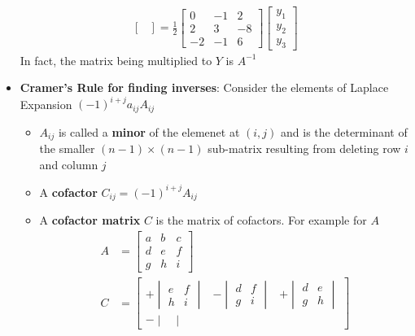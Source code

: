 \begin{itemize}
\begin{align*}
\begin{bmatrix}
      \end{bmatrix}
      = \frac{1}{2} \begin{bmatrix}
        0 & -1 & 2\\
        2 & 3 & -8\\
        -2 & -1 & 6
      \end{bmatrix} \begin{bmatrix}
        y_1\\ y_2\\ y_3
      \end{bmatrix}
    \end{align*}
    In fact, the matrix being multiplied to $Y$ is $A^{-1}$
  \item \textbf{Cramer's Rule for finding inverses}: Consider the elements of Laplace Expansion $(-1)^{i + j} a_{ij} A_{ij}$
    \begin{itemize}
      \item $A_{ij}$ is called a \textbf{minor} of the elemenet at $(i, j)$ and is the determinant of the smaller $(n - 1) \times (n - 1)$ sub-matrix resulting from deleting row $i$ and column $j$
      \item A \textbf{cofactor} $C_{ij} = (-1)^{i + j} A_{ij}$
      \item A \textbf{cofactor matrix} $C$ is the matrix of cofactors. For example for $A$
        \begin{align*}
          A &=
          \begin{bmatrix}
            a & b & c\\
            d & e & f\\
            g & h & i
          \end{bmatrix}\\
          C &=
          \begin{bmatrix}
            + \begin{vmatrix}
              e & f\\
              h & i
            \end{vmatrix}
          &- \begin{vmatrix}
            d & f\\
            g & i
          \end{vmatrix}
          &
          + \begin{vmatrix}
            d & e\\
            g & h
          \end{vmatrix}\\
          - \begin{vmatrix}

\end{vmatrix}
\end{bmatrix}
\end{align*}
\end{itemize}
\end{itemize}
